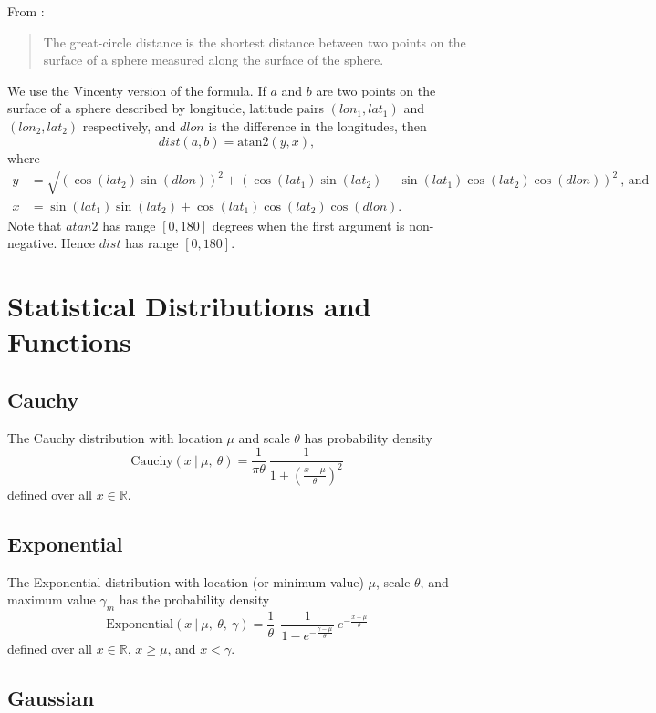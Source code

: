 \documentclass[12pt,letterpaper,onecolumn,oneside]{article}
\begin{document}
\begin{appendices}
From \cite{wiki-great-circle-dist}:
\begin{quote} 
The great-circle distance is the shortest distance between two points on
the surface of a sphere measured along the surface of the sphere.
\end{quote}
We use the Vincenty version of the formula. If $a$ and $b$
are two points on the surface of a sphere described by longitude,
latitude pairs $(lon_1, lat_1)$ and $(lon_2, lat_2)$ respectively, and
$dlon$ is the difference in the longitudes, then
\[dist(a,b) = \text{atan2} (y, x), \]
where
\begin{align*}
y &= \sqrt{(\cos(lat_2) \sin(dlon))^2 
+ (\cos(lat_1) \sin(lat_2) - \sin(lat_1)\cos(lat_2)\cos(dlon))^2} \, 
, \, \text{and}\\
x &= {\sin(lat_1) \sin(lat_2) + \cos(lat_1) \cos(lat_2) \cos(dlon)}.
\end{align*}
Note that $atan2$ \citep{wiki-atan2} has range $[0, 180]$ degrees when the
first argument is non-negative. Hence $dist$ has range $[0, 180]$.

\section{Statistical Distributions and Functions} 

\subsection{Cauchy}

The Cauchy distribution with location $\mu$ and scale
$\theta$ has probability density
\[ \text{Cauchy}(x \ | \ \mu, \ \theta) = 
\frac{1}{\pi \theta} \ \frac{1}{ 1 + (\frac{x - \mu}{\theta})^2 }
\]
defined over all $x \in \mathbb{R}$.

\subsection{Exponential}

The Exponential distribution with location (or minimum value) $\mu$,
scale $\theta$, and maximum value $\gamma_m$ has the probability density
\[ \text{Exponential}(x \ | \ \mu, \ \theta, \ \gamma) =
\frac{1}{\theta} \
\ \frac{1}{1 - e^{-\frac{\gamma-\mu}{\theta}}} \ 
e^{-\frac{ x - \mu} {\theta}} \]
defined over all $x \in \mathbb{R}$, $x \ge \mu$, and $x < \gamma$.

\subsection{Gaussian}


\end{appendices}
\end{document}
